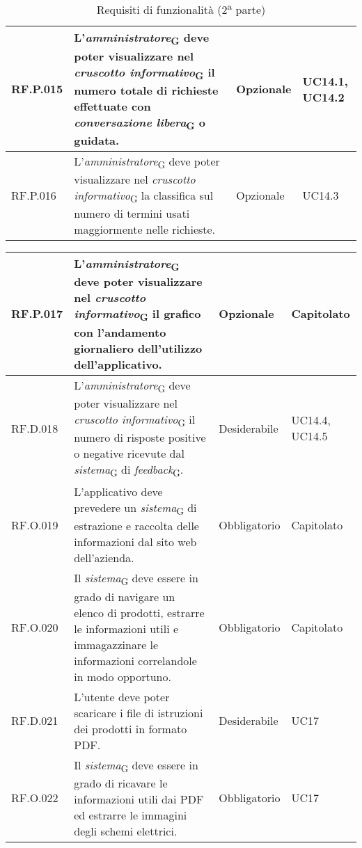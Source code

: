 \begin{table}[H]
\begin{tabular}{|C{2.7cm}|L{7.2cm}|C{2.7cm}|C{2cm}|}
        RF.P.015 & L'\textit{amministratore}\textsubscript{G} deve poter visualizzare nel \textit{cruscotto informativo}\textsubscript{G} il numero totale di richieste effettuate con \textit{conversazione libera}\textsubscript{G} o guidata.
         & Opzionale & UC14.1, UC14.2 \\
        \hline
        RF.P.016 & L'\textit{amministratore}\textsubscript{G} deve poter visualizzare nel \textit{cruscotto informativo}\textsubscript{G} la classifica sul numero di termini usati maggiormente nelle richieste.
         & Opzionale & UC14.3 \\
        \hline
    \end{tabular}
    \caption{Requisiti di funzionalità  (2\textsuperscript{a} parte)}
\end{table}
\begin{table}[H]
\centering
    \begin{tabular}{|C{2.7cm}|L{7.2cm}|C{2.7cm}|C{2cm}|}
        \hline
        RF.P.017 & L'\textit{amministratore}\textsubscript{G} deve poter visualizzare nel \textit{cruscotto informativo}\textsubscript{G} il grafico con l'andamento giornaliero dell’utilizzo dell’applicativo.
         & Opzionale & Capitolato \\
        \hline
        RF.D.018 & L'\textit{amministratore}\textsubscript{G} deve poter visualizzare nel \textit{cruscotto informativo}\textsubscript{G} il numero di risposte positive o negative ricevute dal \textit{sistema}\textsubscript{G} di \textit{feedback}\textsubscript{G}.
         & Desiderabile & UC14.4, UC14.5 \\
        \hline
        RF.O.019 &  L’applicativo deve prevedere un \textit{sistema}\textsubscript{G} di estrazione e raccolta delle informazioni dal sito web dell'azienda.
         & Obbligatorio & Capitolato \\
        \hline
         RF.O.020 & Il \textit{sistema}\textsubscript{G} deve essere in grado di navigare un elenco di prodotti, estrarre le informazioni utili e immagazzinare le informazioni correlandole in modo opportuno.
         & Obbligatorio & Capitolato \\
        \hline
         RF.D.021 & L'utente deve poter scaricare i file di istruzioni dei prodotti in formato PDF.
         & Desiderabile & UC17 \\
        \hline
         RF.O.022 & Il \textit{sistema}\textsubscript{G} deve essere in grado di ricavare le informazioni utili dai PDF ed estrarre le immagini degli schemi elettrici.
         & Obbligatorio & UC17 \\

\end{tabular}
\end{table}
